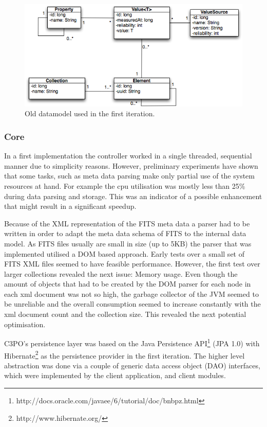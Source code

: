 \begin{figure}[htb]
\begin{center}
\includegraphics[width=5in]{figures/architecture/old_datamodel.png}
\caption{Old datamodel used in the first iteration.}
\label{fig:old_datamodel}
\end{center}
\end{figure}

\subsubsection{Core}
In a first implementation the controller worked in a single threaded, sequential manner due to simplicity reasons. However, preliminary experiments have shown that some tasks, such as meta data parsing make only partial use of the system resources at hand. For example the cpu utilisation was mostly less than 25\% during data parsing and storage. This was an indicator of a possible enhancement that might result in a significant speedup.

Because of the XML representation of the FITS meta data a parser had to be written in order to adapt the meta data schema of FITS to the internal data model. As FITS files usually are small in size (up to 5KB) the parser that was implemented utilised a DOM based approach. Early tests over a small set of FITS XML files seemed to have feasible performance. However, the first test over larger collections revealed the next issue: Memory usage. Even though the amount of objects that had to be created by the DOM parser for each node in each xml document was not so high, the garbage collector of the JVM seemed to be unreliable and the overall consumption seemed to increase constantly with the xml document count and the collection size. This revealed the next potential optimisation.

C3PO's persistence layer was based on the Java Persistence API\footnote{http://docs.oracle.com/javaee/6/tutorial/doc/bnbpz.html} (JPA 1.0) with Hibernate\footnote{http://www.hibernate.org/} as the persistence provider in the first iteration. The higher level abstraction was done via a couple of generic data access object (DAO) interfaces, which were implemented by the client application, and client modules.

